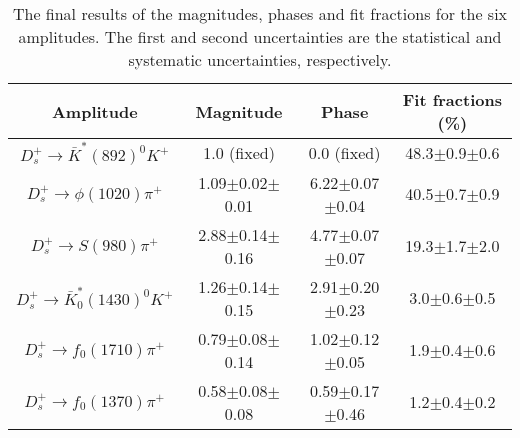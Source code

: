{    \begin{table}[htbp]
        \caption{The final results of the magnitudes, phases and fit fractions for the six amplitudes. The first and second uncertainties are the statistical and systematic uncertainties, respectively.}
        \label{final-result}
        \begin{center}
            \begin{tabular}{cccc}
                \toprule\toprule
                Amplitude & Magnitude  & Phase  & Fit fractions (\%)\\
                \hline
                $D_{s}^{+} \rightarrow \bar{K}^{*}(892)^{0}K^{+}$              & 1.0 (fixed)             & 0.0 (fixed)                & 48.3$\pm$0.9$\pm$0.6\\
                $D_{s}^{+} \rightarrow \phi(1020)\pi^{+}$                      & 1.09$\pm$0.02$\pm$0.01 & 6.22$\pm$0.07$\pm$0.04    & 40.5$\pm$0.7$\pm$0.9\\
                $D_{s}^{+} \rightarrow S(980)\pi^{+}$                          & 2.88$\pm$0.14$\pm$0.16 & 4.77$\pm$0.07$\pm$0.07    & 19.3$\pm$1.7$\pm$2.0\\
                $D_{s}^{+} \rightarrow \bar{K}^{*}_{0}(1430)^{0}K^{+}$         & 1.26$\pm$0.14$\pm$0.15 & 2.91$\pm$0.20$\pm$0.23    & 3.0$\pm$0.6$\pm$0.5\\
                $D_{s}^{+} \rightarrow f_{0}(1710)\pi^{+}$                     & 0.79$\pm$0.08$\pm$0.14 & 1.02$\pm$0.12$\pm$0.05    & 1.9$\pm$0.4$\pm$0.6\\
                $D_{s}^{+} \rightarrow f_{0}(1370)\pi^{+}$                     & 0.58$\pm$0.08$\pm$0.08 & 0.59$\pm$0.17$\pm$0.46    & 1.2$\pm$0.4$\pm$0.2\\
                \bottomrule\bottomrule
            \end{tabular}
        \end{center}
    \end{table}




}
